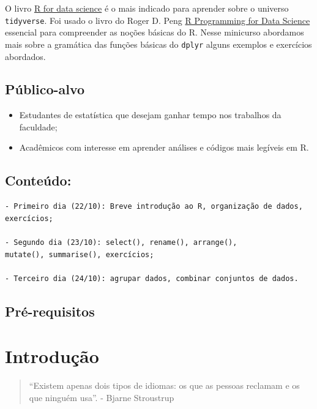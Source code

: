 \documentclass[]{book}
\providecommand{\tightlist}{%
  \setlength{\itemsep}{0pt}\setlength{\parskip}{0pt}}
\begin{document}
O livro \href{https://r4ds.had.co.nz/}{R for data science} é o mais indicado para aprender sobre o universo \texttt{tidyverse}. Foi usado o livro do Roger D. Peng \href{https://bookdown.org/rdpeng/rprogdatascience/}{R Programming for Data Science} essencial para compreender as noções básicas do R. Nesse minicurso abordamos mais sobre a gramática das funções básicas do \texttt{dplyr} alguns exemplos e exercícios abordados.

\hypertarget{puxfablico-alvo}{%
\section{Público-alvo}\label{puxfablico-alvo}}

\begin{itemize}
\tightlist
\item
  Estudantes de estatística que desejam ganhar tempo nos trabalhos da faculdade;
\item
  Acadêmicos com interesse em aprender análises e códigos mais legíveis em R.
\end{itemize}

\hypertarget{conteuxfado}{%
\section{Conteúdo:}\label{conteuxfado}}

\begin{verbatim}
- Primeiro dia (22/10): Breve introdução ao R, organização de dados,
exercícios; 

- Segundo dia (23/10): select(), rename(), arrange(), 
mutate(), summarise(), exercícios;

- Terceiro dia (24/10): agrupar dados, combinar conjuntos de dados.
\end{verbatim}

\hypertarget{pruxe9-requisitos}{%
\section{Pré-requisitos}\label{pruxe9-requisitos}}

\hypertarget{intro}{%
\chapter{Introdução}\label{intro}}

\begin{quote}
``Existem apenas dois tipos de idiomas: os que as pessoas reclamam e os que ninguém usa''. - Bjarne Stroustrup
\end{quote}
\end{document}
